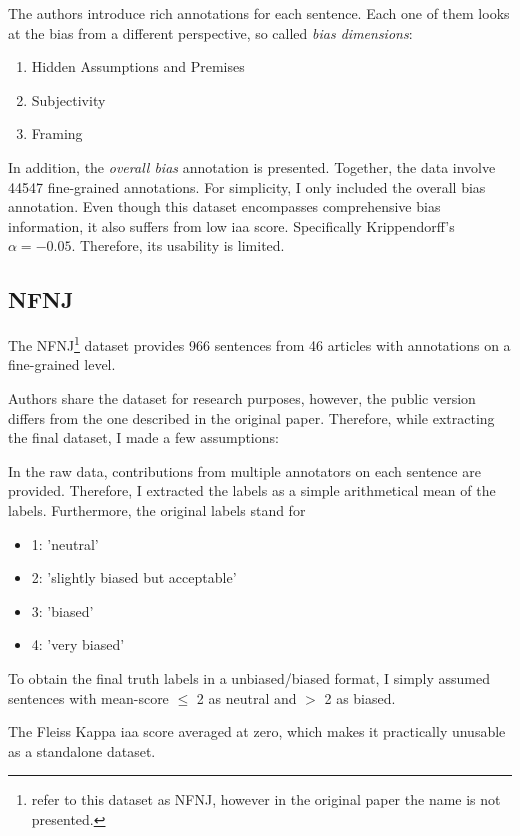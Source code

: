 The authors introduce rich annotations for each sentence. Each one of them looks at the bias from a different perspective, so called \textit{bias dimensions}:
\begin{enumerate}
    \item Hidden Assumptions and Premises
    \item Subjectivity
    \item Framing
\end{enumerate}
In addition, the \textit{overall bias} annotation is presented. Together, the data involve 44547 fine-grained annotations. For simplicity, I only included the overall bias annotation.
Even though this dataset encompasses comprehensive bias information, it also suffers from low \Gls{iaa} score. Specifically Krippendorff’s $\alpha = -0.05$. Therefore, its usability is limited. 




\subsection{NFNJ}
The NFNJ\footnote{\cite{farber2020multidimensional} refer to this dataset as NFNJ, however in the original paper the name is not presented.} dataset provides 966 sentences from 46 articles with annotations on a fine-grained level.

Authors share the dataset for research purposes, however, the public version differs from the one described in the original paper. Therefore, while extracting the final dataset, I made a few assumptions:

In the raw data, contributions from multiple annotators on each sentence are provided. Therefore, I extracted the labels as a simple arithmetical mean of the labels. Furthermore, the original labels stand for 
\begin{itemize}
    \item 1: 'neutral'
    \item 2: 'slightly biased but acceptable'
    \item 3: 'biased'
    \item 4: 'very biased'
\end{itemize}
To obtain the final truth labels in a unbiased/biased format, I simply assumed sentences with mean-score $\leq$ 2 as neutral and $>$ 2 as biased.

The Fleiss Kappa \Gls{iaa} score averaged at zero, which makes it practically unusable as a standalone dataset.



